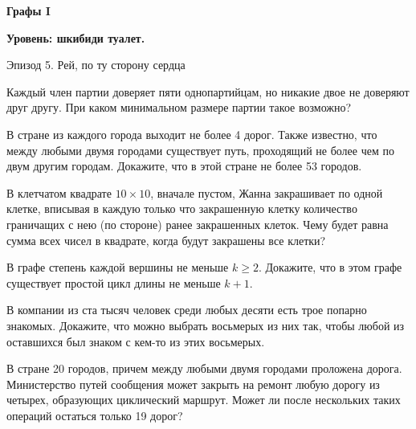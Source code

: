 \centerline{\bf \Huge Графы I}
\centerline{\bf \Huge Уровень: шкибиди туалет.}


\begin{flushright}
        \scriptsize{Эпизод 5. Рей, по ту сторону сердца}
\end{flushright}

Каждый член партии доверяет пяти однопартийцам, но никакие двое не доверяют друг другу. При каком минимальном размере партии такое возможно?

В стране из каждого города выходит не более 4   дорог. Также известно, что между любыми двумя городами существует путь, проходящий не более чем по двум другим городам. Докажите, что в этой стране не более 53   городов.

В клетчатом квадрате $10 \times 10$, вначале пустом, Жанна закрашивает по одной клетке, вписывая в каждую только что закрашенную клетку количество граничащих с нею (по стороне) ранее закрашенных клеток. Чему будет равна сумма всех чисел в квадрате, когда будут закрашены все клетки?

В графе степень каждой вершины не меньше $k \geqslant 2$. Докажите, что в этом графе существует простой цикл длины не меньше $k+1$.

В компании из ста тысяч человек среди любых десяти есть трое попарно знакомых. Докажите, что можно выбрать восьмерых из них так, чтобы любой из оставшихся был знаком с кем-то из этих восьмерых.

В стране 20 городов, причем между любыми двумя городами проложена дорога. Министерство путей сообщения может закрыть на ремонт любую дорогу из четырех, образующих циклический маршрут. Может ли после нескольких таких операций остаться только 19 дорог?